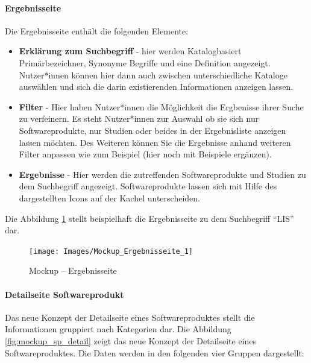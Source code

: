 \clearpage

\paragraph{Ergebnisseite}

Die Ergebnisseite enthält die folgenden Elemente:

\begin{itemize}
\item \textbf{Erklärung zum Suchbegriff} - hier werden Katalogbasiert Primärbezeichner, Synonyme Begriffe und eine Definition angezeigt. Nutzer*innen können hier dann auch zwischen unterschiedliche Kataloge auswählen und sich die darin existierenden Informationen anzeigen lassen.
\item \textbf {Filter} - Hier haben Nutzer*innen die Möglichkeit die Ergbenisse ihrer Suche zu verfeinern. Es steht Nutzer*innen zur Auswahl ob sie sich nur Softwareprodukte, nur Studien oder beides in der Ergebnisliste anzeigen lassen möchten. Des Weiteren können Sie die Ergebnisse anhand weiteren Filter anpassen wie zum Beispiel (hier noch mit Beispiele ergänzen).
\item \textbf{Ergebnisse} - Hier werden die zutreffenden Softwareprodukte und Studien zu dem Suchbegriff angezeigt. Softwareprodukte lassen sich mit Hilfe des dargestellten Icons auf der Kachel unterscheiden.
\end{itemize}

Die Abbildung \ref{fig:mockup_results} stellt beispielhaft die Ergebnisseite zu dem Suchbegriff \enquote{LIS} dar.

\begin{figure}[H]
	\centering
    	\texttt{[image: Images/Mockup\_Ergebnisseite\_1]}
   	\caption[Mockup -- Ergebnisseite]{Mockup -- Ergebnisseite}
   	\label{fig:mockup_results}
\end{figure}

\clearpage

\paragraph{Detailseite Softwareprodukt}

Das neue Konzept der Detailseite eines Softwareproduktes stellt die Informationen gruppiert nach Kategorien dar.
Die Abbildung \ref{fig:mockup_sp_detail} zeigt das neue Konzept der Detailseite eines Softwareproduktes.
Die Daten werden in den folgenden vier Gruppen dargestellt:

